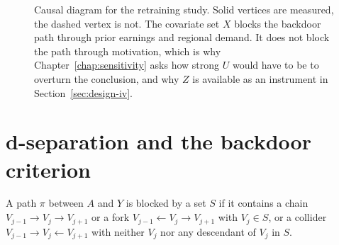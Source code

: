 \begin{figure}[t]
\centering
{}
\caption[Causal diagram for the retraining study]{Causal diagram for the
retraining study. Solid vertices are measured, the dashed vertex is not. The
covariate set $X$ blocks the backdoor path through prior earnings and regional
demand. It does not block the path through motivation, which is why
Chapter~\ref{chap:sensitivity} asks how strong $U$ would have to be to overturn
the conclusion, and why $Z$ is available as an instrument in
Section~\ref{sec:design-iv}.}
\label{fig:confounding-dag}
\end{figure}

\section{d-separation and the backdoor criterion}
\label{sec:graph-backdoor}

\begin{definition}
\label{def:blocked}
A path $\pi$ between $A$ and $Y$ is blocked by a set $S$ if it contains a chain
$V_{j-1} \to V_j \to V_{j+1}$ or a fork $V_{j-1} \leftarrow V_j \to V_{j+1}$
with $V_j \in S$, or a collider $V_{j-1} \to V_j \leftarrow V_{j+1}$ with
neither $V_j$ nor any descendant of $V_j$ in $S$.
\end{definition}

